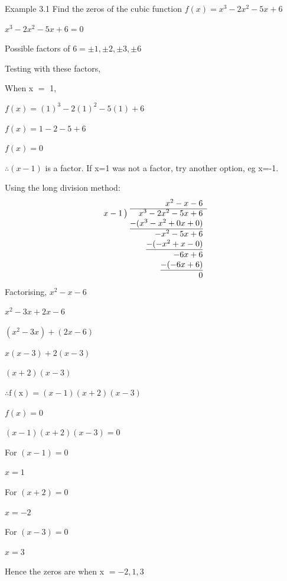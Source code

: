 \begin{example}{Example 3.1}
Find the zeros of the cubic function $f(x) = x^3 - 2x^2 - 5x + 6$

\solution
$x^3 - 2x^2 - 5x + 6 = 0$

Possible factors of $6 = \pm 1, \pm 2, \pm 3, \pm 6$

Testing with these factors,

When x $=$ 1,

$f(x) = (1)^3 - 2(1)^2 - 5(1) + 6$

$f(x) = 1 - 2 - 5 + 6$

$f(x) = 0$

$\therefore (x - 1)$ is a factor. If x=1 was not a factor, try another option, eg x=-1.

Using the long division method:
\[
\begin{array}{r@{\;}r}
 & x^2 - x - 6 \\ \cline{2-2}
x - 1\,\big) & x^3 - 2x^2 - 5x + 6 \\
 & \underline{-(x^3 - x^2 + 0x + 0)} \\
 & -x^2 - 5x + 6 \\
 & \underline{-(-x^2 + x - 0)} \\
 & -6x + 6 \\
 & \underline{-(-6x + 6)} \\
 & 0
\end{array}
\]
Factorising, $x^2 - x - 6$

$x^2 - 3x + 2x - 6$

$(x^2 - 3x) + (2x - 6)$

$x(x - 3) + 2(x - 3)$

$(x + 2)(x - 3)$

$\therefore \mathrm{f}(\mathrm{x}) = (x - 1)(x + 2)(x - 3)$

$f(x) = 0$

$(x - 1)(x + 2)(x - 3) = 0$

For $(x - 1) = 0$

$x = 1$

For $(x + 2) = 0$

$x = -2$

For $(x - 3) = 0$

$x = 3$

Hence the zeros are when x $= -2, 1, 3$
\end{example}


